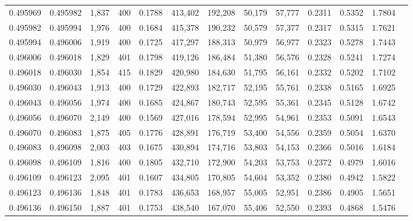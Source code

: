\begin{tabular}{rrrrrrrrrrrrr}
0.495969 & 0.495982 & 1,837 & 400 &                                     0.1788 & 413,402 & 192,208 &  50,179 &  57,777 & 0.2311 & 0.5352 & 1.7804 \\
0.495982 & 0.495994 & 1,976 & 400 &                                     0.1684 & 415,378 & 190,232 &  50,579 &  57,377 & 0.2317 & 0.5315 & 1.7621 \\
0.495994 & 0.496006 & 1,919 & 400 &                                     0.1725 & 417,297 & 188,313 &  50,979 &  56,977 & 0.2323 & 0.5278 & 1.7443 \\
0.496006 & 0.496018 & 1,829 & 401 &                                     0.1798 & 419,126 & 186,484 &  51,380 &  56,576 & 0.2328 & 0.5241 & 1.7274 \\
0.496018 & 0.496030 & 1,854 & 415 &                                     0.1829 & 420,980 & 184,630 &  51,795 &  56,161 & 0.2332 & 0.5202 & 1.7102 \\
0.496030 & 0.496043 & 1,913 & 400 &                                     0.1729 & 422,893 & 182,717 &  52,195 &  55,761 & 0.2338 & 0.5165 & 1.6925 \\
0.496043 & 0.496056 & 1,974 & 400 &                                     0.1685 & 424,867 & 180,743 &  52,595 &  55,361 & 0.2345 & 0.5128 & 1.6742 \\
0.496056 & 0.496070 & 2,149 & 400 &                                     0.1569 & 427,016 & 178,594 &  52,995 &  54,961 & 0.2353 & 0.5091 & 1.6543 \\
0.496070 & 0.496083 & 1,875 & 405 &                                     0.1776 & 428,891 & 176,719 &  53,400 &  54,556 & 0.2359 & 0.5054 & 1.6370 \\
0.496083 & 0.496098 & 2,003 & 403 &                                     0.1675 & 430,894 & 174,716 &  53,803 &  54,153 & 0.2366 & 0.5016 & 1.6184 \\
0.496098 & 0.496109 & 1,816 & 400 &                                     0.1805 & 432,710 & 172,900 &  54,203 &  53,753 & 0.2372 & 0.4979 & 1.6016 \\
0.496109 & 0.496123 & 2,095 & 401 &                                     0.1607 & 434,805 & 170,805 &  54,604 &  53,352 & 0.2380 & 0.4942 & 1.5822 \\
0.496123 & 0.496136 & 1,848 & 401 &                                     0.1783 & 436,653 & 168,957 &  55,005 &  52,951 & 0.2386 & 0.4905 & 1.5651 \\
0.496136 & 0.496150 & 1,887 & 401 &                                     0.1753 & 438,540 & 167,070 &  55,406 &  52,550 & 0.2393 & 0.4868 & 1.5476 \\

\end{tabular}
